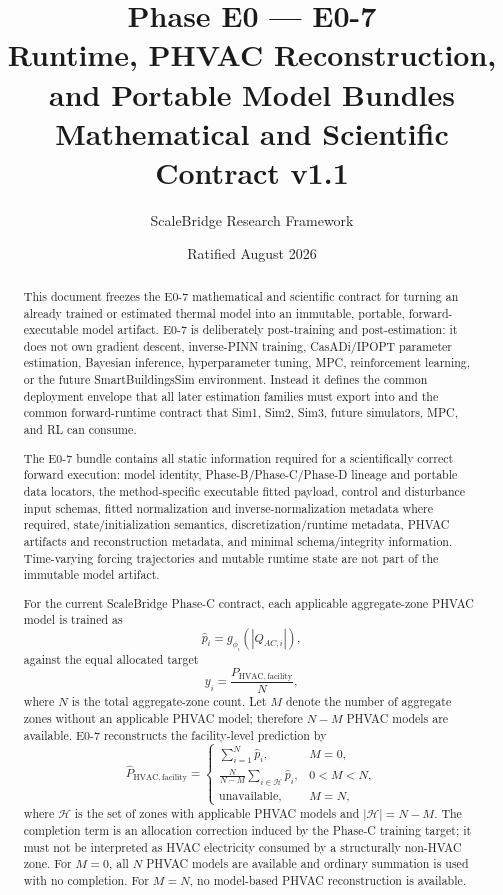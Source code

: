 \documentclass[11pt]{article}
\title{\SB{} Phase E0 --- E0-7\\
Runtime, PHVAC Reconstruction, and Portable Model Bundles\\
Mathematical and Scientific Contract v1.1}
\author{ScaleBridge Research Framework}
\date{Ratified August 2026}
\begin{document}
\maketitle

\begin{abstract}
This document freezes the E0-7 mathematical and scientific contract for turning
an already trained or estimated thermal model into an immutable, portable,
forward-executable model artifact. E0-7 is deliberately post-training and
post-estimation: it does not own gradient descent, inverse-PINN training,
CasADi/IPOPT parameter estimation, Bayesian inference, hyperparameter tuning,
MPC, reinforcement learning, or the future SmartBuildingsSim environment.
Instead it defines the common deployment envelope that all later estimation
families must export into and the common forward-runtime contract that Sim1,
Sim2, Sim3, future simulators, MPC, and RL can consume.

The E0-7 bundle contains all static information required for a scientifically
correct forward execution: model identity, Phase-B/Phase-C/Phase-D lineage and
portable data locators, the method-specific executable fitted payload, control
and disturbance input schemas, fitted normalization and inverse-normalization
metadata where required, state/initialization semantics, discretization/runtime
metadata, PHVAC artifacts and reconstruction metadata, and minimal
schema/integrity information. Time-varying forcing trajectories and mutable
runtime state are not part of the immutable model artifact.

For the current ScaleBridge Phase-C contract, each applicable aggregate-zone
PHVAC model is trained as
\[
  \hat p_i=g_{\phi_i}(|Q_{AC,i}|),
\]
against the equal allocated target
\[
  y_i=\frac{P_{\mathrm{HVAC,facility}}}{N},
\]
where $N$ is the total aggregate-zone count. Let $M$ denote the number of
aggregate zones without an applicable PHVAC model; therefore $N-M$ PHVAC models
are available. E0-7 reconstructs the facility-level prediction by
\[
\boxed{
\hat P_{\mathrm{HVAC,facility}}=
\begin{cases}
\displaystyle\sum_{i=1}^{N}\hat p_i, & M=0,\\[6pt]
\displaystyle\frac{N}{N-M}\sum_{i\in\mathcal H}\hat p_i, & 0<M<N,\\[8pt]
\text{unavailable}, & M=N,
\end{cases}}
\]
where $\mathcal H$ is the set of zones with applicable PHVAC models and
$|\mathcal H|=N-M$. The completion term is an allocation correction induced by
the Phase-C training target; it must not be interpreted as HVAC electricity
consumed by a structurally non-HVAC zone. For $M=0$, all $N$ PHVAC models are
available and ordinary summation is used with no completion. For $M=N$, no
model-based PHVAC reconstruction is available.
\end{abstract}
\end{document}

